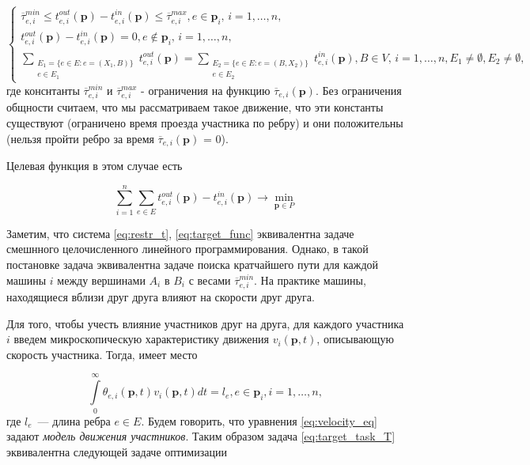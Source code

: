 \documentclass[12pt, a4paper]{article}
\DeclareMathOperator*{\minn}{min}
\begin{document}
\begin{equation}
\label{eq:restr_t}
 \begin{cases}
	\overline{\tau}_{e, i}^{min} \le t_{e, i}^{out}(\textbf{p}) - t_{e, i}^{in}(\textbf{p}) \le \overline{\tau}_{e, i}^{max}, e \in \textbf{p}_i,\, i = 1, \dots, n,
	\\
	t_{e, i}^{out}(\textbf{p}) - t_{e, i}^{in}(\textbf{p}) = 0, e \notin \textbf{p}_i,\, i = 1, \dots, n,
	\\
	 \sum \limits_{ \substack{E_1 = \{ e \in E: e = (X_1, B) \} \\ e \in E_1}} t_{e, i}^{out} (\textbf{p}) = \sum \limits_{ \substack{E_2 = \{ e \in E: e = (B, X_2) \} \\ e \in E_2}} t_{e, i}^{in} (\textbf{p}), B \in V,\, i = 1, \dots, n, E_1 \ne \emptyset, E_2 \ne \emptyset,
\end{cases}
\end{equation}
где конснтанты $\overline{\tau}_{e, i}^{min}$ и $\overline{\tau}_{e, i}^{max}$ - ограничения на функцию $\overline{\tau}_{e, i} (\textbf{p})$. Без ограничения общности считаем, что мы рассматриваем такое движение, что эти константы существуют (ограничено время проезда участника по ребру) и они положительны (нельзя пройти ребро за время $\overline{\tau}_{e, i} (\textbf{p})$ = 0).

Целевая функция в этом случае есть

\begin{equation}
	\label{eq:target_func}
		\sum \limits_{i = 1}^n \sum \limits_{e \in E} t_{e, i}^{out}(\textbf{p}) - t_{e, i}^{in}(\textbf{p}) \rightarrow \minn \limits _{\textbf{p} \in P}
\end{equation}

Заметим, что система \eqref{eq:restr_t}, \eqref{eq:target_func} эквивалентна задаче смешнного целочисленного линейного программирования. Однако, в такой постановке задача эквивалентна задаче поиска кратчайшего пути для каждой машины $i$ между вершинами $A_i$ в $B_i$ с весами $\overline{\tau}_{e, i}^{min}$. На практике машины, находящиеся вблизи друг друга влияют на скорости друг друга.

Для того, чтобы учесть влияние участников друг на друга, для каждого участника $i$ введем микроскопическую характеристику движения $v_i(\textbf{p}, t)$, описывающую скорость участника.
Тогда, имеет место

\begin{equation}
\label{eq:velocity_eq}
\int\limits_{0}^{\infty} \theta_{e, i} (\textbf{p}, t) v_i(\textbf{p}, t) dt = l_e, e \in \textbf{p}_i, i = 1, \dots, n,
\end{equation}
где $l_e$~--- длина ребра $e \in E$. Будем говорить, что уравнения \eqref{eq:velocity_eq} задают \textit{модель движения участников}. Таким образом задача \eqref{eq:target_task_T} эквивалентна следующей задаче оптимизации
\end{document}
